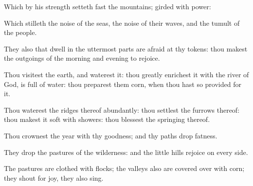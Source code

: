 {\Q {}Which by his
strength setteth
fast the
mountains;
{}
girded with
power:


\par }{\Q {}Which
stilleth the
noise of the
seas, the
noise of their
waves, and the
tumult of the
people.


\par }{\Q {}They also that
dwell in the uttermost
parts are
afraid at thy
tokens: thou makest the
outgoings of the
morning and
evening to
rejoice.


\par }{\Q {}Thou
visitest the
earth, and
waterest it: thou
greatly
enrichest it with the
river of
God,
{} is
full of
water: thou
preparest them
corn, when thou hast so
provided for it.


\par }{\Q {}Thou
waterest the
ridges thereof
abundantly: thou
settlest the
furrows thereof: thou makest it
soft with
showers: thou
blessest the
springing thereof.


\par }{\Q {}Thou
crownest the
year with thy
goodness; and thy
paths
drop
fatness.


\par }{\Q {}They
drop
{} the
pastures of the
wilderness: and the little
hills
rejoice on every
side.


\par }{\Q {}The
pastures are
clothed with
flocks; the
valleys also are covered
over with
corn; they shout for
joy, they also
sing.




\par }

